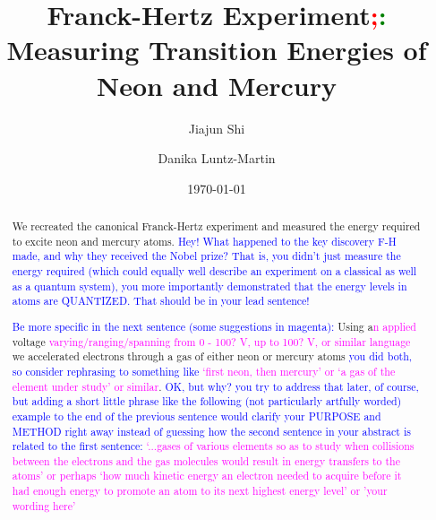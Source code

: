\documentclass[prb,preprint]{revtex4-1}
\begin{document}
\title{Franck-Hertz Experiment\textcolor{red}{;}\textcolor{green}{:} Measuring Transition Energies of Neon and Mercury}

\author{Jiajun Shi}


\author{Danika Luntz-Martin}


\date{\today}

\begin{abstract}

We recreated the canonical Franck-Hertz experiment and measured the energy required to excite neon and mercury atoms.  \textcolor{blue}{Hey! What happened to the key discovery F-H made, and why they received the Nobel prize? That is, you didn't just measure the energy required (which could equally well describe an experiment on a classical as well as a quantum system), you more importantly demonstrated that the energy levels in atoms are QUANTIZED. That should be in your lead sentence! }  

\textcolor{blue}{Be more specific in the next sentence (some suggestions in magenta):} Using a\textcolor{magenta}{n applied} voltage \textcolor{magenta}{varying/ranging/spanning from 0 - 100? V, up to 100? V, or similar language} we accelerated electrons through a gas of either neon or mercury atoms \textcolor{blue}{you did both, so consider rephrasing to something like}\textcolor{magenta}{ `first neon, then mercury' or `a gas of the element under study' or similar}. 
\textcolor{blue}{OK, but why? you try to address that later, of course, but adding a short little phrase like the following (not particularly artfully worded) example to the end of the previous sentence would clarify your PURPOSE and METHOD right away instead of guessing how the second sentence in your abstract is related to the first sentence:}\textcolor{magenta}{   `...gases of various elements so as to study when collisions between the electrons and the gas molecules would result in energy transfers to the atoms' or perhaps `how much kinetic energy an electron needed to acquire before it had enough energy to promote an atom to its next highest energy level' or 'your wording here' }


\end{abstract}
\end{document}
